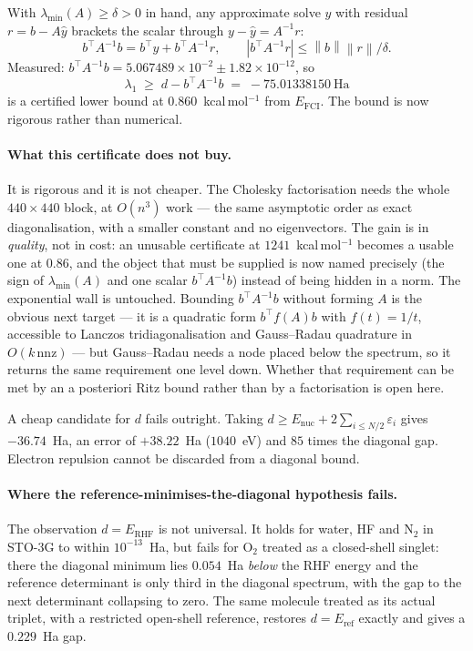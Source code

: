 \documentclass[11pt,a4paper]{article}
\theoremstyle{plain}
\theoremstyle{definition}
\theoremstyle{remark}
\newcommand{\norm}[1]{\left\lVert #1\right\rVert}
\newcommand{\abs}[1]{\left\lvert #1\right\rvert}
\begin{document}
With $\lambda_{\min}(A) \ge \delta > 0$ in hand, any approximate solve $\hat y$ with
residual $r = b - A\hat y$ brackets the scalar through $y - \hat y = A^{-1}r$:
\[
  b^\top A^{-1}b = b^\top\hat y + b^\top A^{-1}r,
  \qquad
  \abs{b^\top A^{-1}r} \le \norm{b}\norm{r}/\delta .
\]
Measured: $b^\top A^{-1}b = 5.067489\times10^{-2} \pm 1.82\times10^{-12}$, so
\[
  \lambda_1 \;\ge\; d - b^\top A^{-1}b \;=\; -75.01338150\ \text{Ha}
\]
is a certified lower bound at $0.860$~kcal\,mol$^{-1}$ from $E_{\mathrm{FCI}}$.
The bound is now rigorous rather than numerical.

\paragraph{What this certificate does not buy.}
It is rigorous and it is not cheaper. The Cholesky factorisation needs the whole
$440\times440$ block, at $O(n^3)$ work --- the same asymptotic order as exact
diagonalisation, with a smaller constant and no eigenvectors. The gain is in
\emph{quality}, not in cost: an unusable certificate at $1241$~kcal\,mol$^{-1}$
becomes a usable one at $0.86$, and the object that must be supplied is now named
precisely (the sign of $\lambda_{\min}(A)$ and one scalar $b^\top A^{-1}b$) instead
of being hidden in a norm. The exponential wall is untouched. Bounding
$b^\top A^{-1}b$ without forming $A$ is the obvious next target --- it is a
quadratic form $b^\top f(A)b$ with $f(t)=1/t$, accessible to Lanczos
tridiagonalisation and Gauss--Radau quadrature in $O(k\,\mathrm{nnz})$ --- but
Gauss--Radau needs a node placed below the spectrum, so it returns the same
requirement one level down. Whether that requirement can be met by an a posteriori
Ritz bound rather than by a factorisation is open here.

A cheap candidate for $d$ fails outright. Taking
$d \ge E_{\mathrm{nuc}} + 2\sum_{i\le N/2}\varepsilon_i$ gives $-36.74$~Ha, an error
of $+38.22$~Ha ($1040$~eV) and $85$ times the diagonal gap. Electron repulsion
cannot be discarded from a diagonal bound.

\paragraph{Where the reference-minimises-the-diagonal hypothesis fails.}
The observation $d = E_{\mathrm{RHF}}$ is not universal. It holds for water, HF and
N$_2$ in STO-3G to within $10^{-13}$~Ha, but fails for O$_2$ treated as a closed-shell
singlet: there the diagonal minimum lies $0.054$~Ha \emph{below} the RHF energy and
the reference determinant is only third in the diagonal spectrum, with the gap to
the next determinant collapsing to zero. The same molecule treated as its actual
triplet, with a restricted open-shell reference, restores $d = E_{\mathrm{ref}}$
exactly and gives a $0.229$~Ha gap.
\end{document}
